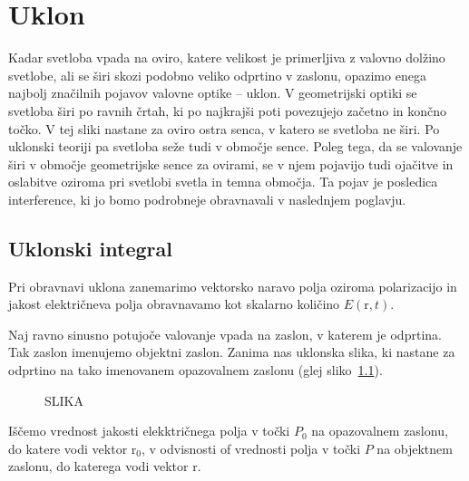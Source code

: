 
\chapter{Uklon}
Kadar svetloba vpada na oviro, katere velikost je primerljiva z valovno 
dolžino svetlobe, ali se širi skozi podobno veliko odprtino v zaslonu, 
opazimo enega najbolj značilnih pojavov valovne optike -- uklon.
V geometrijski optiki se svetloba širi po ravnih črtah, ki po 
najkrajši poti povezujejo začetno in končno točko. V tej sliki nastane
za oviro ostra senca, v katero se svetloba ne širi. Po uklonski teoriji
pa svetloba seže tudi v območje sence. Poleg tega, da se valovanje širi
v območje geometrijske sence za ovirami, se v njem pojavijo tudi ojačitve
in oslabitve oziroma pri svetlobi svetla in temna območja. Ta pojav
je posledica interference, ki jo bomo podrobneje obravnavali v
naslednjem poglavju. 
\section{Uklonski integral}
Pri obravnavi uklona zanemarimo vektorsko naravo polja oziroma
polarizacijo in jakost električneva polja obravnavamo kot skalarno količino
$E(\mathrm{r},t)$.

Naj ravno sinusno potujoče valovanje vpada na zaslon, v katerem je odprtina.
Tak zaslon imenujemo objektni zaslon. Zanima nas uklonska slika, ki nastane
za odprtino na tako imenovanem opazovalnem zaslonu (glej sliko~\ref{fig:05_shema}).
\begin{figure}[ht]
\centering
\def\svgwidth{120truemm} 
%
\caption{SLIKA}
\label{fig:05_shema}
\end{figure}

Iščemo vrednost jakosti elekktričnega polja v točki $P_0$ na opazovalnem zaslonu, 
do katere vodi vektor $\mathrm{r}_0$, v odvisnosti of vrednosti polja v točki $P$
na objektnem zaslonu, do katerega vodi vektor $\mathrm{r}$. 

